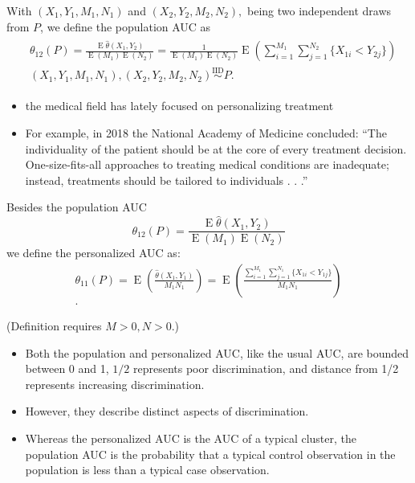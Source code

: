 \documentclass{beamer}
\DeclareMathOperator{\E}{E}
\renewcommand{\P}{P}
\newcommand{\cind}{\perp \!\!\! \perp}
\newcommand{\aucindiv}{\theta_{11}}%
\newcommand{\aucpop}{\theta_{12}}%
\begin{document}
\begin{frame}
  With $(X_1,Y_1,M_1,N_1)$ and $(X_2,Y_2,M_2,N_2),$ being two independent draws from $P$, we define the population AUC as
  \begin{gather}
    \begin{aligned}
      &\aucpop(\P)=\frac{\E\hat{\theta}(X_1,Y_2)}{\E(M_1)\E(N_2)}
      = \frac{1}{\E(M_1)\E(N_2)}\E\left( \sum_{i=1}^{M_1}\sum_{j=1}^{N_2}\{X_{1i}<Y_{2j}\}\right)\\
      &(X_1,Y_1,M_1,N_1),(X_2,Y_2,M_2,N_2) \overset{\text{IID}}{\sim} \P.
    \end{aligned}
  \end{gather}
\end{frame}

\begin{frame}
  \begin{itemize}
  \item     the medical field has lately focused on
    personalizing treatment
  \item For example, in 2018 the National Academy of Medicine concluded: ``The
    individuality of the patient should be at the core of every treatment
    decision. One-size-fits-all approaches to treating medical conditions
    are inadequate; instead, treatments should be tailored to individuals
    . . .''
  \end{itemize}
\end{frame}

\begin{frame}
 Besides the population AUC
$$      \aucpop(\P)=\frac{\E\hat\theta(X_1,Y_2)}{\E(M_1)\E(N_2)}
$$
we define the personalized AUC as:
\begin{align}
  \aucindiv(\P)=\E\left(\frac{\hat\theta(X_1,Y_1)}{M_1N_1} \right)
  = \E\left(\frac{ \sum_{i=1}^{M_1}\sum_{j=1}^{N_1}\{X_{1i}<Y_{1j}\}}{M_1N_1} \right)\\.
  \label{defn:aucindiv}
\end{align}

(Definition requires $M>0,N>0$.)


\end{frame}

\begin{frame}
  \begin{itemize}
\item Both the population and personalized AUC, like the usual AUC, are bounded between 0
and 1, $1/2$ represents poor discrimination, and distance from 1/2 represents increasing discrimination.

\item However, they describe distinct aspects of discrimination. %

\item Whereas the personalized AUC is the AUC of a typical cluster, the population AUC
is the probability that a typical control observation in the
population is less than a typical case observation.
\end{itemize}
\end{frame}
\end{document}
